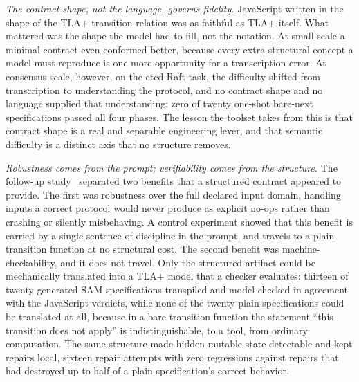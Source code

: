 \documentclass[11pt]{article}
\begin{document}
\emph{The contract shape, not the language, governs fidelity.} JavaScript
written in the shape of the TLA+ transition relation was as faithful as TLA+
itself. What mattered was the shape the model had to fill, not the notation.
At small scale a minimal contract even conformed better, because every extra
structural concept a model must reproduce is one more opportunity for a
transcription error. At consensus scale, however, on the etcd Raft task, the
difficulty shifted from transcription to understanding the protocol, and no
contract shape and no language supplied that understanding: zero of twenty
one-shot bare-next specifications passed all four phases. The lesson the
toolset takes from this is that contract shape is a real and separable
engineering lever, and that semantic difficulty is a distinct axis that no
structure removes.

\emph{Robustness comes from the prompt; verifiability comes from the
structure.} The follow-up study~\cite{robust} separated two benefits that a
structured contract appeared to provide. The first was robustness over the
full declared input domain, handling inputs a correct protocol would never
produce as explicit no-ops rather than crashing or silently misbehaving. A
control experiment showed that this benefit is carried by a single sentence of
discipline in the prompt, and travels to a plain transition function at no
structural cost. The second benefit was machine-checkability, and it does not
travel. Only the structured artifact could be mechanically translated into a
TLA+ model that a checker evaluates: thirteen of twenty generated SAM
specifications transpiled and model-checked in agreement with the JavaScript
verdicts, while none of the twenty plain specifications could be translated at
all, because in a bare transition function the statement ``this transition
does not apply'' is indistinguishable, to a tool, from ordinary computation.
The same structure made hidden mutable state detectable and kept repairs
local, sixteen repair attempts with zero regressions against repairs that had
destroyed up to half of a plain specification's correct behavior.
\end{document}
